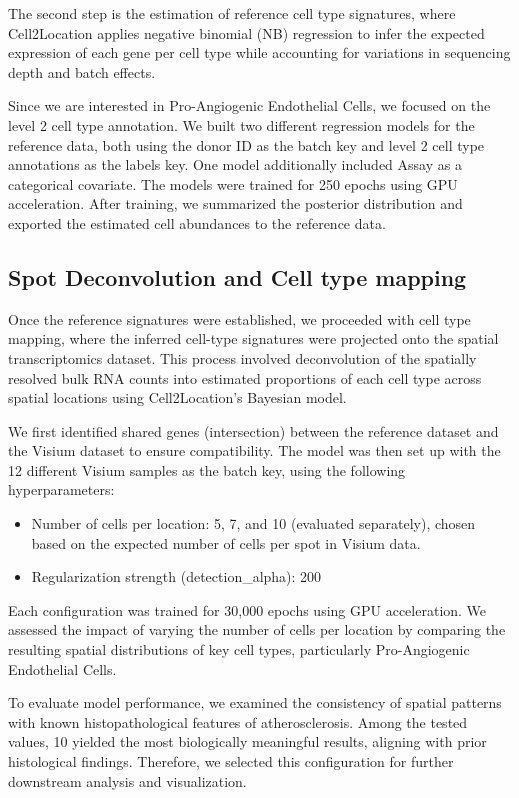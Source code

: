 \documentclass[a4paper,12pt]{article}
\begin{document}
The second step is the estimation of reference cell type signatures, where Cell2Location applies negative binomial (NB) regression to infer the expected expression of each gene per cell type while accounting for variations in sequencing depth and batch effects.

Since we are interested in Pro-Angiogenic Endothelial
Cells, we focused on the level 2 cell type annotation. We built two different regression models for the reference data, both using the donor ID as the batch key and level 2 cell type annotations as the labels key. One model additionally included Assay as a categorical covariate. The models were trained for 250 epochs using GPU acceleration. After training, we summarized the posterior distribution and exported the estimated cell abundances to the reference data.

\subsection{Spot Deconvolution and Cell type mapping}

Once the reference signatures were established, we proceeded with cell type mapping, where the inferred cell-type signatures were projected onto the spatial transcriptomics dataset. This process involved deconvolution of the spatially resolved bulk RNA counts into estimated proportions of each cell type across spatial locations using Cell2Location’s Bayesian model.

We first identified shared genes (intersection) between the reference dataset and the Visium dataset to ensure compatibility. The model was then set up with the 12 different Visium samples as the batch key, using the following hyperparameters:

\begin{itemize}
    \item{Number of cells per location: 5, 7, and 10 (evaluated separately), chosen based on the expected number of cells per spot in Visium data.}
    \item{Regularization strength (detection\_alpha): 200}
\end{itemize}

Each configuration was trained for 30,000 epochs using GPU acceleration. We assessed the impact of varying the number of cells per location by comparing the resulting spatial distributions of key cell types, particularly Pro-Angiogenic Endothelial Cells.

To evaluate model performance, we examined the consistency of spatial patterns with known histopathological features of atherosclerosis. Among the tested values, 10 yielded the most biologically meaningful results, aligning with prior histological findings. Therefore, we selected this configuration for further downstream analysis and visualization.
\end{document}
